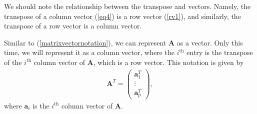\documentclass[10pt]{article}
\newcommand{\done}{\hfill $\square$}
\begin{document}
We should note the relationship between the transpose and vectors. Namely, the transpose of a column vector (\ref{eq4}) is a row vector (\ref{rv1}), and similarly, the transpose of a row vector is a column vector. 

Similar to (\ref{matrixvectornotation}), we can represent $\mathbf{A}$ as a vector. Only this time, we will represent it as a column vector, where the $i^{\text{th}}$ entry is the transpose of the $i^{\text{th}}$ column vector of $\mathbf{A}$, which is a row vector. This notation is given by 
\begin{align}
    \label{transposevectornotation}
    \mathbf{A}^T = \begin{pmatrix}
        \mathbf{a}_1^T \\ \vdots \\ \mathbf{a}_p^T
    \end{pmatrix},
\end{align}
where $\mathbf{a}_i$ is the $i^{\text{th}}$ column vector of $\mathbf{A}$.



\end{document}

